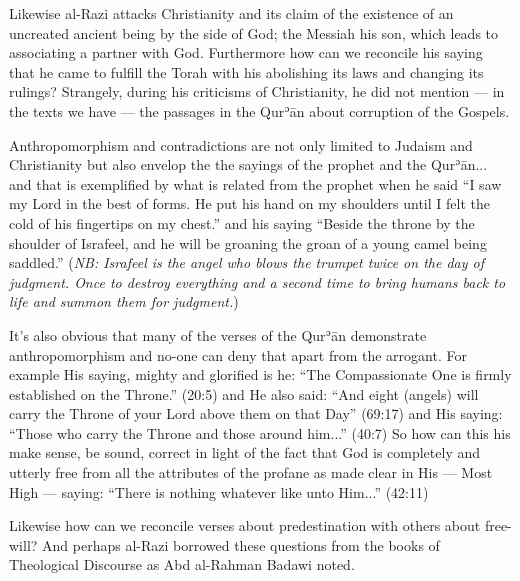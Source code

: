 \documentclass[12pt]{book}
\def \Quran{Qurʾān} %
\def \Qrn{\Quran}   %
\newcommand{\NB}[1]{\emph{\small NB: #1}}
\begin{document}
Likewise al-Razi attacks Christianity and its claim of the existence of
an uncreated ancient being by the side of God;
the Messiah his son, which leads to associating a partner with God.
Furthermore how can we reconcile his saying that he came to fulfill the Torah
with his abolishing its laws and changing its rulings?
Strangely, during his criticisms of Christianity,
he did not mention — in the texts we have —
the passages in the \Qrn{} about corruption of the Gospels.\footnotemark


Anthropomorphism and contradictions are not only limited to Judaism and
Christianity but also envelop the the sayings of the prophet and the \Quran...
and that is exemplified by what is related from the prophet when he said
“I saw my Lord in the best of forms.
He put his hand on my shoulders until I felt
the cold of his fingertips on my chest.”\footnotemark
{}
and his saying “Beside the throne by the shoulder of Israfeel,
and he will be groaning the groan of a young camel being saddled.”\footnotemark
(\NB{Israfeel is the angel who blows the trumpet twice on the day of judgment.
Once to destroy everything and a second time to bring humans back to life and
summon them for judgment.})


It’s also obvious that many of the verses of the \Qrn{} demonstrate
anthropomorphism and no-one can deny that apart from the arrogant.
For example His saying, mighty and glorified is he:
“The Compassionate One is firmly established on the Throne.” (20:5)
and He also said: “And eight (angels) will carry the Throne of your Lord
above them on that Day” (69:17) and His saying:
“Those who carry the Throne and those around him...” (40:7)
So how can this his make sense, be sound, correct in light of the fact that
God is completely and utterly free from all the attributes of the profane as
made clear in His — Most High — saying:
“There is nothing whatever like unto Him...” (42:11)

Likewise how can we reconcile verses about predestination
with others about free-will?
And perhaps al-Razi borrowed these questions from the books of
Theological Discourse as Abd al-Rahman Badawi noted.\footnotemark

\end{document}
